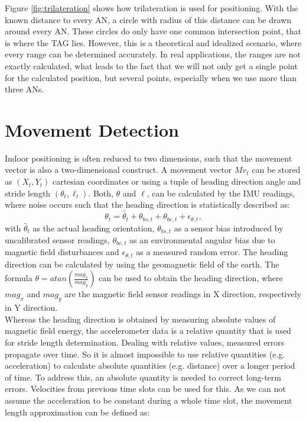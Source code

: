Figure \ref{fig:trilateration} shows how trilateration is used for positioning. With the known distance to every AN, a circle with radius of this distance can be drawn around every AN. These circles do only have one common intersection point, that is where the TAG lies. However, this is a theoretical and idealized scenario, where every range can be determined accurately. In real applications, the ranges are not exactly calculated, what leads to the fact that we will not only get a single point for the calculated position, but several points, especially when we use more than three ANs.

\section{Movement Detection}
Indoor positioning is often reduced to two dimensions, such that the movement vector is also a two-dimensional construct. A movement vector $Mv_{t}$ can be stored as $(X_{t}, Y_{t})$ cartesian coordinates or using a tuple of heading direction angle and stride length $(\theta_{t}, \ell_{t})$. Both, $\theta$ and $\ell$, can be calculated by the IMU readings, where noise occurs such that the heading direction is statistically described as:
\begin{equation}
\theta_{t} = \hat{\theta}_{t} + \theta_{bs,t} + \theta_{be,t} + \epsilon_{\theta, t},
\label{eqn:heading_direction}
\end{equation}
with $\hat{\theta}_{t}$ as the actual heading orientation,  $\theta_{bs,t}$ as a sensor bias introduced by uncalibrated sensor readings, $\theta_{be,t}$ as an environmental angular bias due to magnetic field disturbances and $\epsilon_{\theta, t}$ as a measured random error. The heading direction can be calculated by using the geomagnetic field of the earth. The formula $\theta = atan(\frac{mag_{x}}{mag_{y}})$ can be used to obtain the heading direction, where $mag_{x}$ and $mag_{y}$ are the magnetic field sensor readings in X direction, respectively in Y direction.\\
\noindent\hspace*{5mm}%
Whereas the heading direction is obtained by measuring absolute values of magnetic field energy, the accelerometer data is a relative quantity that is used for stride length determination. Dealing with relative values, measured errors propagate over time. So it is almost impossible to use relative quantities (e.g. acceleration) to calculate absolute quantities (e.g. distance) over a longer period of time. To address this, an absolute quantity is needed to correct long-term errors. Velocities from previous time slots can be used for this. As we can not assume the acceleration to be constant during a whole time slot, the movement length approximation can be defined as: 
